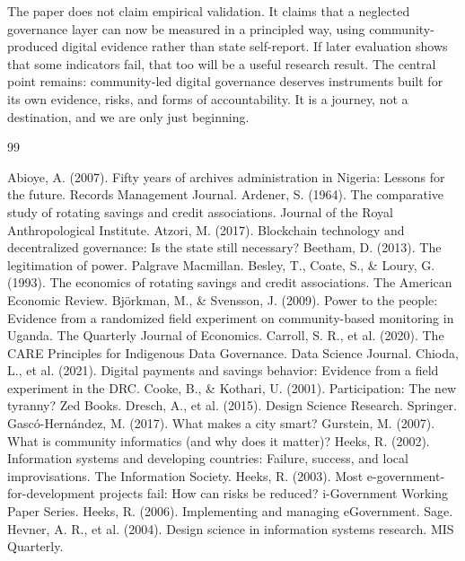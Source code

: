 \documentclass[sigconf,anonymous]{acmart}
\begin{document}
The paper does not claim empirical validation. It claims that a neglected governance layer can now be measured in a principled way, using community-produced digital evidence rather than state self-report. If later evaluation shows that some indicators fail, that too will be a useful research result. The central point remains: community-led digital governance deserves instruments built for its own evidence, risks, and forms of accountability. It is a journey, not a destination, and we are only just beginning.

\begin{thebibliography}{99}

 Abioye, A. (2007). Fifty years of archives administration in Nigeria: Lessons for the future. Records Management Journal.
 Ardener, S. (1964). The comparative study of rotating savings and credit associations. Journal of the Royal Anthropological Institute.
 Atzori, M. (2017). Blockchain technology and decentralized governance: Is the state still necessary?
 Beetham, D. (2013). The legitimation of power. Palgrave Macmillan.
 Besley, T., Coate, S., \& Loury, G. (1993). The economics of rotating savings and credit associations. The American Economic Review.
 Björkman, M., \& Svensson, J. (2009). Power to the people: Evidence from a randomized field experiment on community-based monitoring in Uganda. The Quarterly Journal of Economics.
 Carroll, S. R., et al. (2020). The CARE Principles for Indigenous Data Governance. Data Science Journal.
 Chioda, L., et al. (2021). Digital payments and savings behavior: Evidence from a field experiment in the DRC.
 Cooke, B., \& Kothari, U. (2001). Participation: The new tyranny? Zed Books.
 Dresch, A., et al. (2015). Design Science Research. Springer.
 Gascó-Hernández, M. (2017). What makes a city smart?
 Gurstein, M. (2007). What is community informatics (and why does it matter)?
 Heeks, R. (2002). Information systems and developing countries: Failure, success, and local improvisations. The Information Society.
 Heeks, R. (2003). Most e-government-for-development projects fail: How can risks be reduced? i-Government Working Paper Series.
 Heeks, R. (2006). Implementing and managing eGovernment. Sage.
 Hevner, A. R., et al. (2004). Design science in information systems research. MIS Quarterly.

\end{thebibliography}
\end{document}
